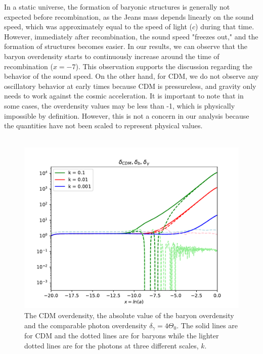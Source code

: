 \documentclass{aa}
\begin{document}
In a static universe, the formation of baryonic structures is generally not expected before recombination, as the Jeans mass depends linearly on the sound speed, which was approximately equal to the speed of light ($c$) during that time. However, immediately after recombination, the sound speed "freezes out," and the formation of structures becomes easier. In our results, we can observe that the baryon overdensity starts to continuously increase around the time of recombination ($x=-7$). This observation supports the discussion regarding the behavior of the sound speed. On the other hand, for CDM, we do not observe any oscillatory behavior at early times because CDM is pressureless, and gravity only needs to work against the cosmic acceleration. It is important to note that in some cases, the overdensity values may be less than -1, which is physically impossible by definition. However, this is not a concern in our analysis because the quantities have not been scaled to represent physical values.\\ \\
\begin{figure}[h!]
   \includegraphics[scale=0.5]{Figures/milestone_3/deltas.pdf}
   \caption{The CDM overdensity, the absolute value of the baryon overdensity and the comparable photon overdensity $\delta_\gamma = 4\Theta_0$. The solid lines are for CDM and the dotted lines are for baryons while the lighter dotted lines are for the photons at three different scales, $k$. }
   \label{fig:M3_deltas}
\end{figure}
\end{document}

